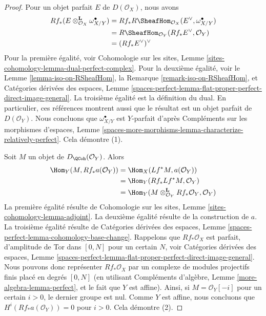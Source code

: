 \begin{proof}
Pour un objet parfait $E$ de $D(\mathcal{O}_X)$, nous avons
\begin{align*}
Rf_*(E \otimes_{\mathcal{O}_X}^\mathbf{L} \omega_{X/Y}^\bullet)
& =
Rf_*R\SheafHom_{\mathcal{O}_X}(E^\vee, \omega_{X/Y}^\bullet) \\
& =
R\SheafHom_{\mathcal{O}_Y}(Rf_*E^\vee, \mathcal{O}_Y) \\
& =
(Rf_*E^\vee)^\vee
\end{align*}
Pour la première égalité, voir
Cohomologie sur les sites, Lemme \ref{sites-cohomology-lemma-dual-perfect-complex}.
Pour la deuxième égalité, voir le Lemme \ref{lemma-iso-on-RSheafHom},
la Remarque \ref{remark-iso-on-RSheafHom}, et
Catégories dérivées des espaces, Lemme
\ref{spaces-perfect-lemma-flat-proper-perfect-direct-image-general}.
La troisième égalité est la définition du dual. En particulier,
ces références montrent aussi que le résultat est un objet parfait
de $D(\mathcal{O}_Y)$. Nous concluons que $\omega_{X/Y}^\bullet$
est $Y$-parfait d'après Compléments sur les morphismes d'espaces, Lemme
\ref{spaces-more-morphisms-lemma-characterize-relatively-perfect}.
Cela démontre (1).

\medskip\noindent
Soit $M$ un objet de $D_\QCoh(\mathcal{O}_Y)$. Alors
\begin{align*}
\Hom_Y(M, Rf_*a(\mathcal{O}_Y)) & =
\Hom_X(Lf^*M, a(\mathcal{O}_Y)) \\
& =
\Hom_Y(Rf_*Lf^*M, \mathcal{O}_Y) \\
& =
\Hom_Y(M \otimes_{\mathcal{O}_Y}^\mathbf{L} Rf_*\mathcal{O}_Y, \mathcal{O}_Y)
\end{align*}
La première égalité résulte de Cohomologie sur les sites, Lemme
\ref{sites-cohomology-lemma-adjoint}.
La deuxième égalité résulte de la construction de $a$.
La troisième égalité résulte de Catégories dérivées des espaces, Lemme
\ref{spaces-perfect-lemma-cohomology-base-change}.
Rappelons que $Rf_*\mathcal{O}_X$ est parfait, d'amplitude de Tor dans $[0, N]$
pour un certain $N$, voir
Catégories dérivées des espaces, Lemme
\ref{spaces-perfect-lemma-flat-proper-perfect-direct-image-general}.
Nous pouvons donc représenter $Rf_*\mathcal{O}_X$ par un complexe de
modules projectifs finis placé en degrés $[0, N]$
(en utilisant Compléments d'algèbre, Lemme \ref{more-algebra-lemma-perfect},
et le fait que $Y$ est affine).
Ainsi, si $M = \mathcal{O}_Y[-i]$ pour un certain $i > 0$, le dernier
groupe est nul. Comme $Y$ est affine, nous concluons que
$H^i(Rf_*a(\mathcal{O}_Y)) = 0$ pour $i > 0$.
Cela démontre (2).


\end{proof}
